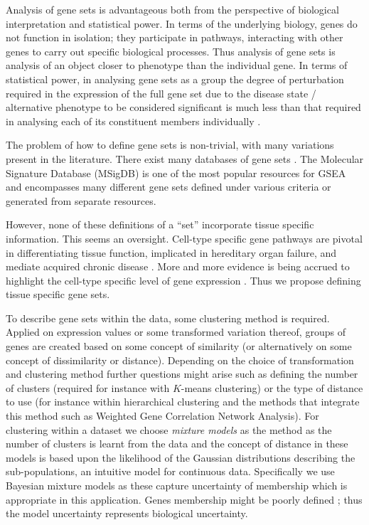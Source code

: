 \documentclass[12pt]{article} %
\begin{document}
	Analysis of gene sets is advantageous both from the perspective of biological interpretation and statistical power. In terms of the underlying biology, genes do not function in isolation; they participate in pathways, interacting with other genes to carry out specific biological processes. Thus analysis of gene sets is analysis of an object closer to phenotype than the individual gene. In terms of statistical power, in analysing gene sets as a group the degree of perturbation required in the expression of the full gene set due to the disease state / alternative phenotype to be considered significant is much less than that required in analysing each of its constituent members individually \cite{DudbridgePowerPredictiveAccuracy2013}\cite{WrayResearchReviewPolygenic2014}.
	
	The problem of how to define gene sets is non-trivial, with many variations present in the literature. There exist many databases of gene sets \cite{AshburnerGeneOntologytool2000a}\cite{KanehisaNewapproachunderstanding2019}\cite{SzklarczykSTRINGv11protein2019}. The Molecular Signature Database \cite{SubramanianGenesetenrichment2005a} (MSigDB) is one of the most popular resources for GSEA and encompasses many different gene sets defined under various criteria or generated from separate resources.
	
	However, none of these definitions of a ``set'' incorporate tissue specific information. This seems an oversight. Cell-type specific gene pathways are pivotal in differentiating tissue function, implicated in hereditary organ failure, and mediate acquired chronic disease \cite{JuDefiningcelltypespecificity2013a}. More and more evidence is being accrued to highlight the cell-type specific level of gene expression \cite{GrundbergMappingcistransregulatory2012}\cite{OngEnhancerfunctionnew2011}\cite{ManiatisRegulationinducibletissuespecific1987}. Thus we propose defining tissue specific gene sets. 
	
	To describe gene sets within the data, some clustering method is required. Applied on expression values or some transformed variation thereof, groups of genes are created based on some concept of similarity (or alternatively on some concept of dissimilarity or distance). Depending on the choice of transformation and clustering method further questions might arise such as defining the number of clusters (required for instance with $K$-means clustering) or the type of distance to use (for instance within hierarchical clustering and the methods that integrate this method such as Weighted Gene Correlation Network Analysis). For clustering within a dataset we choose \emph{mixture models} as the method as the number of clusters is learnt from the data and the concept of distance in these models is based upon the likelihood of the Gaussian distributions describing the sub-populations, an intuitive model for continuous data. Specifically we use Bayesian mixture models as these capture uncertainty of membership which is appropriate in this application. Genes membership might be poorly defined \cite{Pita-JuarezPathwayCoexpressionNetwork2018}; thus the model uncertainty represents biological uncertainty.
\end{document}
